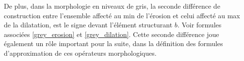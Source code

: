 \vspace{-1.6mm}
\noindent De plus, dans la morphologie en niveaux de gris, la seconde différence de construction entre l'ensemble affecté au min de l'érosion et celui affecté au max de la dilatation, est le signe devant l'élément structurant $b$. Voir formules associées \ref{grey_erosion} et \ref{grey_dilation}. Cette seconde différence joue également un rôle important pour la suite, dans la définition des formules d'approximation de ces opérateurs morphologiques. 

\vfill

